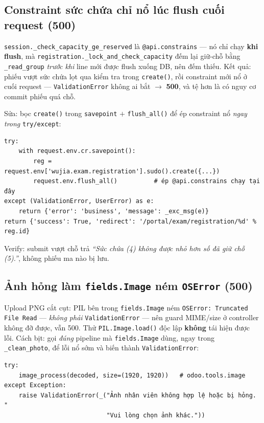 \subsection{Constraint sức chứa chỉ nổ lúc flush cuối request (500)}

\texttt{session.\_check\_capacity\_ge\_reserved} là \texttt{@api.constrains} --- nó chỉ chạy
\textbf{khi flush}, mà \texttt{registration.\_lock\_and\_check\_capacity} đếm lại giữ-chỗ
bằng \texttt{\_read\_group} \emph{trước khi} line mới được flush xuống DB, nên đếm thiếu.
Kết quả: phiếu vượt sức chứa lọt qua kiểm tra trong \texttt{create()}, rồi constraint mới
nổ ở cuối request --- \texttt{ValidationError} không ai bắt $\rightarrow$ \textbf{500}, và
tệ hơn là có nguy cơ commit phiếu quá chỗ.

Sửa: bọc \texttt{create()} trong \texttt{savepoint} $+$ \texttt{flush\_all()} để ép
constraint nổ \emph{ngay trong} \texttt{try/except}:

\begin{lstlisting}[style=python]
try:
    with request.env.cr.savepoint():
        reg = request.env['wujia.exam.registration'].sudo().create({...})
        request.env.flush_all()          # ép @api.constrains chạy tại đây
except (ValidationError, UserError) as e:
    return {'error': 'business', 'message': _exc_msg(e)}
return {'success': True, 'redirect': '/portal/exam/registration/%d' % reg.id}
\end{lstlisting}

Verify: submit vượt chỗ trả \emph{``Sức chứa (4) không được nhỏ hơn số đã giữ chỗ (5).''},
không phiếu ma nào bị lưu.

\subsection{Ảnh hỏng làm \texttt{fields.Image} ném \texttt{OSError} (500)}

Upload PNG cắt cụt: PIL bên trong \texttt{fields.Image} ném \texttt{OSError: Truncated File
Read} --- \emph{không phải} \texttt{ValidationError} --- nên guard MIME/size ở controller
không đỡ được, vẫn 500. Thử \texttt{PIL.Image.load()} độc lập \textbf{không} tái hiện được
lỗi. Cách bịt: gọi \emph{đúng} pipeline mà \texttt{fields.Image} dùng, ngay trong
\texttt{\_clean\_photo}, để lỗi nổ sớm và biến thành \texttt{ValidationError}:

\begin{lstlisting}[style=python]
try:
    image_process(decoded, size=(1920, 1920))   # odoo.tools.image
except Exception:
    raise ValidationError(_("Ảnh nhân viên không hợp lệ hoặc bị hỏng. "
                            "Vui lòng chọn ảnh khác."))
\end{lstlisting}

